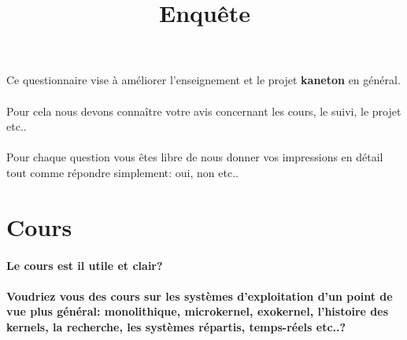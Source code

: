 \documentclass[10pt,a4wide]{article}
\title{Enqu\^ete}
\begin{document}
\maketitle

Ce questionnaire vise \`a am\'eliorer l'enseignement et le projet
\textbf{kaneton} en g\'en\'eral.

\paragraph{}

Pour cela nous devons conna\^itre votre avis concernant les cours, le suivi,
le projet etc..

\paragraph{}

Pour chaque question vous \^etes libre de nous donner vos impressions en
d\'etail tout comme r\'epondre simplement: oui, non etc..



\section{Cours}

\paragraph{}

\textbf{Le cours est il utile et clair?}
\paragraph{}
\paragraph{}
\paragraph{}

\textbf{Voudriez vous des cours sur les syst\`emes d'exploitation d'un
        point de vue plus g\'en\'eral: monolithique, microkernel, exokernel,
        l'histoire des kernels, la recherche, les syst\`emes r\'epartis,
        temps-r\'eels etc..?}
\paragraph{}
\paragraph{}
\end{document}
